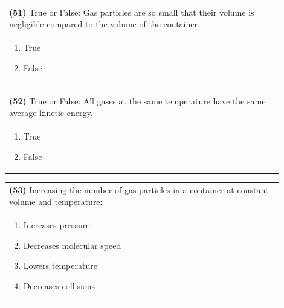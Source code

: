 \documentclass{article}
\begin{document}
\vspace{0.2cm}
\noindent\begin{tabular}{|p{0.9\linewidth}|}
\hline
\textbf{(51)} True or False: Gas particles are so small that their volume is negligible compared to the volume of the container.\\[0.2cm]

\begin{minipage}[t]{0.85\linewidth}
\begin{enumerate}[label=\alph*.]
\item True
\item False
\end{enumerate}
\end{minipage}\\[0.2cm]
\hline
\end{tabular}

\vspace{0.2cm}
\noindent\begin{tabular}{|p{0.9\linewidth}|}
\hline
\textbf{(52)} True or False: All gases at the same temperature have the same average kinetic energy.\\[0.2cm]

\begin{minipage}[t]{0.85\linewidth}
\begin{enumerate}[label=\alph*.]
\item True
\item False
\end{enumerate}
\end{minipage}\\[0.2cm]
\hline
\end{tabular}

\newpage

\noindent\begin{tabular}{|p{0.9\linewidth}|}
\hline
\textbf{(53)} Increasing the number of gas particles in a container at constant volume and temperature:\\[0.2cm]

\begin{minipage}[t]{0.85\linewidth}
\begin{enumerate}[label=\alph*.]
\item Increases pressure
\item Decreases molecular speed
\item Lowers temperature
\item Decreases collisions
\end{enumerate}
\end{minipage}\\[0.2cm]
\hline
\end{tabular}
\end{document}
